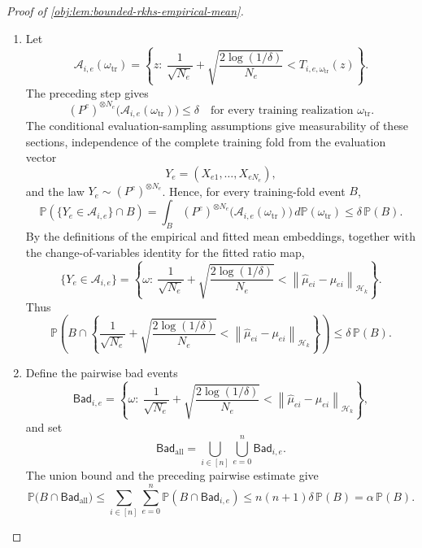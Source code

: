 \documentclass[11pt]{article}
\begin{document}
\begin{proof}[Proof of \cref{obj:lem:bounded-rkhs-empirical-mean}]
\begin{enumerate}
\item Let
\[
\mathcal A_{i,e}(\omega_{\mathrm{tr}})
=
\left\{
z:\ 
\frac1{\sqrt{N_e}}
+\sqrt{\frac{2\log(1/\delta)}{N_e}}
<
T_{i,e,\omega_{\mathrm{tr}}}(z)
\right\}.
\]
The preceding step gives
\[
(P^e)^{\otimes N_e}\bigl(\mathcal A_{i,e}(\omega_{\mathrm{tr}})\bigr)\le\delta
\quad\text{for every training realization }\omega_{\mathrm{tr}}.
\]
The conditional evaluation-sampling assumptions give measurability of these sections, independence of the complete training fold from the evaluation vector
\[
Y_e=(X_{e1},\ldots,X_{eN_e}),
\]
and the law \(Y_e\sim (P^e)^{\otimes N_e}\).  Hence, for every training-fold event \(B\),
\[
\mathbb P\!\left(\{Y_e\in \mathcal A_{i,e}\}\cap B\right)
=
\int_B
(P^e)^{\otimes N_e}\bigl(\mathcal A_{i,e}(\omega_{\mathrm{tr}})\bigr)
\,d\mathbb P(\omega_{\mathrm{tr}})
\le
\delta\,\mathbb P(B).
\]
By the definitions of the empirical and fitted mean embeddings, together with the change-of-variables identity for the fitted ratio map,
\[
\{Y_e\in \mathcal A_{i,e}\}
=
\left\{
\omega:\ 
\frac1{\sqrt{N_e}}
+\sqrt{\frac{2\log(1/\delta)}{N_e}}
<
\left\|\widehat\mu_{ei}-\mu_{ei}\right\|_{\mathcal H_k}
\right\}.
\]
Thus
\[
\mathbb P\!\left(
B\cap
\left\{
\frac1{\sqrt{N_e}}
+\sqrt{\frac{2\log(1/\delta)}{N_e}}
<
\left\|\widehat\mu_{ei}-\mu_{ei}\right\|_{\mathcal H_k}
\right\}
\right)
\le
\delta\,\mathbb P(B).
\]

\item Define the pairwise bad events
\[
\mathsf{Bad}_{i,e}
=
\left\{
\omega:\ 
\frac1{\sqrt{N_e}}
+\sqrt{\frac{2\log(1/\delta)}{N_e}}
<
\left\|\widehat\mu_{ei}-\mu_{ei}\right\|_{\mathcal H_k}
\right\},
\]
and set
\[
\mathsf{Bad}_{\mathrm{all}}
=
\bigcup_{i\in[n]}\bigcup_{e=0}^{n}\mathsf{Bad}_{i,e}.
\]
The union bound and the preceding pairwise estimate give
\[
\mathbb P\bigl(B\cap \mathsf{Bad}_{\mathrm{all}}\bigr)
\le
\sum_{i\in[n]}\sum_{e=0}^{n}
\mathbb P(B\cap \mathsf{Bad}_{i,e})
\le
n(n+1)\delta\,\mathbb P(B)
=
\alpha\,\mathbb P(B).
\]


\end{enumerate}
\end{proof}
\end{document}
